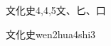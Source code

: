 \begin{entry}{文化史}{4,4,5}{⽂、⼔、⼝}
  \begin{phonetics}{文化史}{wen2hua4shi3}
  \end{phonetics}
\end{entry}

